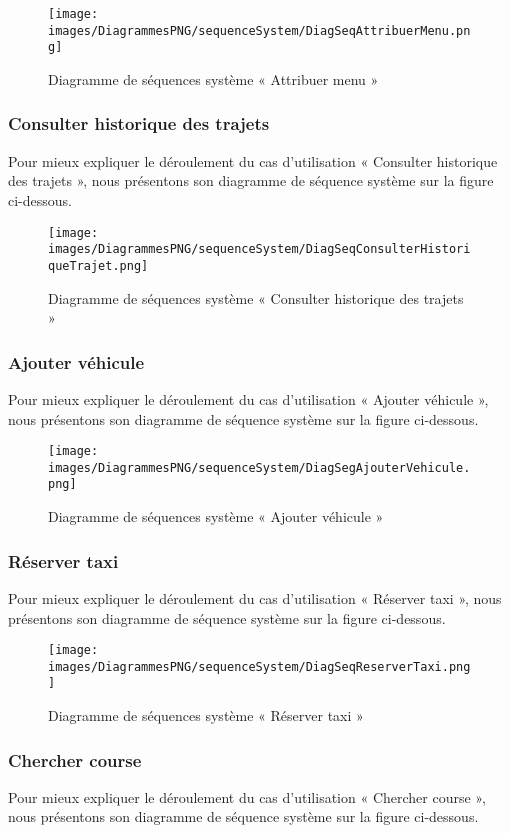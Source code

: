 {\begin{figure}[H]
\centering
\texttt{[image: images/DiagrammesPNG/sequenceSystem/DiagSeqAttribuerMenu.png]}
\caption{Diagramme de séquences système « Attribuer menu »}
\end{figure}

\newpage
\subsubsection{Consulter historique des trajets}
Pour mieux expliquer le déroulement du cas d'utilisation « Consulter historique des trajets », nous présentons son diagramme de séquence système sur la figure ci-dessous.

\begin{figure}[H]
\centering
\texttt{[image: images/DiagrammesPNG/sequenceSystem/DiagSeqConsulterHistoriqueTrajet.png]}
\caption{Diagramme de séquences système « Consulter historique des trajets »}
\end{figure}

\newpage
\subsubsection{Ajouter véhicule}
Pour mieux expliquer le déroulement du cas d'utilisation « Ajouter véhicule », nous présentons son diagramme de séquence système sur la figure ci-dessous.

\begin{figure}[H]
\centering
\texttt{[image: images/DiagrammesPNG/sequenceSystem/DiagSegAjouterVehicule.png]}
\caption{Diagramme de séquences système « Ajouter véhicule »}
\end{figure}

\newpage
\subsubsection{Réserver taxi}
Pour mieux expliquer le déroulement du cas d'utilisation « Réserver taxi »,  nous présentons son diagramme de séquence système sur la figure ci-dessous.

\begin{figure}[H]
\centering
\texttt{[image: images/DiagrammesPNG/sequenceSystem/DiagSeqReserverTaxi.png]}
\caption{Diagramme de séquences système « Réserver taxi »}
\end{figure}

\newpage
\subsubsection{Chercher course}
Pour mieux expliquer le déroulement du cas d'utilisation « Chercher course », nous présentons son diagramme de séquence système sur la figure ci-dessous.

}
